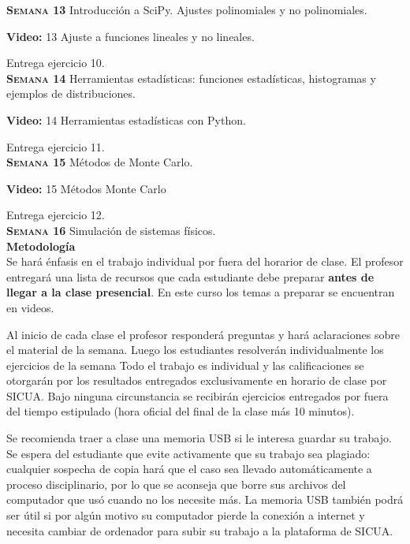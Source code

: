 \documentclass[letterpaper,10pt,onecolumn]{article}
\begin{document}
\noindent\textbf{\textsc{Semana 13}} Introducción a
SciPy. Ajustes polinomiales y no polinomiales.

\textbf{Video:} 13 Ajuste a funciones lineales y no lineales.

Entrega ejercicio 10.
\\[-0.3cm]  

\noindent\textbf{\textsc{Semana 14}} Herramientas
estadísticas: funciones estadísticas, histogramas y ejemplos de
distribuciones.

\textbf{Video:} 14 Herramientas estadísticas con Python.

Entrega ejercicio 11.
\\[-0.3cm] 

\noindent\textbf{\textsc{Semana 15}} Métodos de Monte Carlo.


\textbf{Video:} 15 M\'etodos Monte Carlo 

Entrega ejercicio 12.
\\[-0.3cm] 

\noindent\textbf{\textsc{Semana 16}} Simulaci\'on de sistemas f\'isicos. \\[0.1cm] 


\noindent\textbf{\large {} \quad Metodología}\\[-0.2cm]

\noindent\normalsize Se har\'a \'enfasis en el trabajo individual por
fuera del horarior de clase. El profesor entregar\'a una lista de
recursos que cada estudiante debe preparar {\bf antes de llegar a la
  clase presencial}.   
En este curso los temas a preparar se encuentran en videos.

Al inicio de cada clase el profesor responderá preguntas y 
hará aclaraciones sobre el material de la semana. Luego los
estudiantes resolverán individualmente los ejercicios de la semana 
Todo el trabajo es individual y las calificaciones se otorgar\'an por
los resultados entregados exclusivamente en horario de clase por SICUA. 
Bajo ninguna circunstancia se recibirán ejercicios entregados por fuera 
del tiempo estipulado (hora oficial del final de la clase más 10 minutos).

Se recomienda traer a clase una memoria USB si le interesa guardar su 
trabajo. Se espera del estudiante que evite activamente que
su trabajo sea plagiado: cualquier sospecha de copia hará que el caso sea
llevado automáticamente a proceso disciplinario, por lo que se aconseja
que borre sus archivos del computador que usó cuando no los necesite más.
La memoria USB también podrá ser útil si por algún motivo su computador
pierde la conexión a internet y necesita cambiar de ordenador para subir
su trabajo a la plataforma de SICUA.
\\[0.1cm] 
\end{document}
